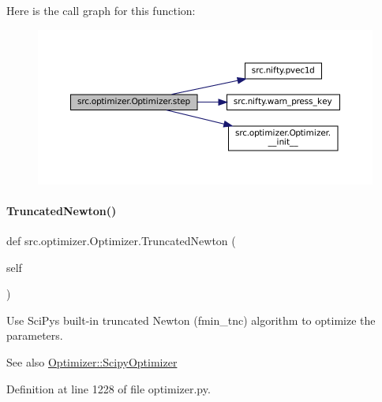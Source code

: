 Here is the call graph for this function\+:
\nopagebreak
\begin{figure}[H]
\begin{center}
\leavevmode
\includegraphics[width=350pt]{classsrc_1_1optimizer_1_1Optimizer_ad8a296a7a624707234b4c9fc949c5dbd_cgraph}
\end{center}
\end{figure}
\mbox{\label{classsrc_1_1optimizer_1_1Optimizer_aba52ed682c83784e4523223c0bbb018b}} 
\paragraph{\texorpdfstring{Truncated\+Newton()}{TruncatedNewton()}}
{\footnotesize\ttfamily def src.\+optimizer.\+Optimizer.\+Truncated\+Newton (\begin{DoxyParamCaption}\item[{}]{self }\end{DoxyParamCaption})}



Use Sci\+Py\textquotesingle{}s built-\/in truncated Newton (fmin\+\_\+tnc) algorithm to optimize the parameters. 

\begin{DoxySeeAlso}{See also}
\hyperlink{classsrc_1_1optimizer_1_1Optimizer_a1e616a4c920b3e8935ca19e208b1c3be}{Optimizer\+::\+Scipy\+Optimizer} 
\end{DoxySeeAlso}


Definition at line 1228 of file optimizer.\+py.

